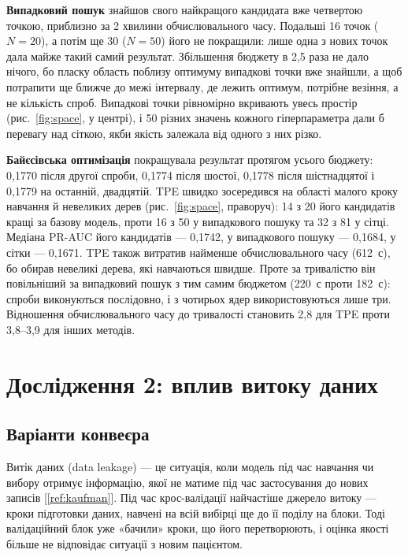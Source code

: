 \documentclass[14pt,a4paper]{extreport}
\begin{document}
\textbf{Випадковий пошук} знайшов свого найкращого кандидата вже четвертою точкою, приблизно за 2 хвилини обчислювального часу. Подальші 16 точок ($N = 20$), а потім ще 30 ($N = 50$) його не покращили: лише одна з нових точок дала майже такий самий результат. Збільшення бюджету в 2,5 раза не дало нічого, бо пласку область поблизу оптимуму випадкові точки вже знайшли, а щоб потрапити ще ближче до межі інтервалу, де лежить оптимум, потрібне везіння, а не кількість спроб. Випадкові точки рівномірно вкривають увесь простір (рис.~\ref{fig:space}, у центрі), і 50 різних значень кожного гіперпараметра дали б перевагу над сіткою, якби якість залежала від одного з них різко.

\textbf{Байєсівська оптимізація} покращувала результат протягом усього бюджету: 0,1770 після другої спроби, 0,1774 після шостої, 0,1778 після шістнадцятої і 0,1779 на останній, двадцятій. TPE швидко зосередився на області малого кроку навчання й невеликих дерев (рис.~\ref{fig:space}, праворуч): 14 з 20 його кандидатів кращі за базову модель, проти 16 з 50 у випадкового пошуку та 32 з 81 у сітці. Медіана PR-AUC його кандидатів --- 0,1742, у випадкового пошуку --- 0,1684, у сітки --- 0,1671. TPE також витратив найменше обчислювального часу (612~с), бо обирав невеликі дерева, які навчаються швидше. Проте за тривалістю він повільніший за випадковий пошук з тим самим бюджетом (220~с проти 182~с): спроби виконуються послідовно, і з чотирьох ядер використовуються лише три. Відношення обчислювального часу до тривалості становить 2,8 для TPE проти 3,8--3,9 для інших методів.

\section{Дослідження 2: вплив витоку даних}
\label{sec:leakage}

\subsection{Варіанти конвеєра}

Витік даних (data leakage) --- це ситуація, коли модель під час навчання чи вибору отримує інформацію, якої не матиме під час застосування до нових записів [\ref{ref:kaufman}]. Під час крос-валідації найчастіше джерело витоку --- кроки підготовки даних, навчені на всій вибірці ще до її поділу на блоки. Тоді валідаційний блок уже «бачили» кроки, що його перетворюють, і оцінка якості більше не відповідає ситуації з новим пацієнтом.
\end{document}
